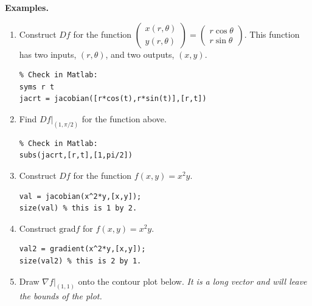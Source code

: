 \documentclass[12pt,letterpaper,noanswers]{exam}
\begin{document}
\noindent\textbf{Examples.}

\begin{enumerate}
\item Construct $Df$ for the function $\left(\begin{array}{c} x(r,\theta) \\ y(r,\theta) \end{array}\right) = \left(\begin{array}{c} r\cos\theta \\ r\sin\theta \end{array}\right)$.  This function has two inputs, $(r,\theta)$, and two outputs, $(x,y)$.
\vspace{0.7in}



\begin{lstlisting}
% Check in Matlab:
syms r t
jacrt = jacobian([r*cos(t),r*sin(t)],[r,t])
\end{lstlisting}

\item Find $\left.Df\right\vert_{(1,\pi/2)}$ for the function above.
\vspace{0.5in}


\begin{lstlisting}
% Check in Matlab:
subs(jacrt,[r,t],[1,pi/2])
\end{lstlisting}

\item Construct $Df$ for the function $f(x,y) = x^2y$.
\vspace{0.3in}

\begin{lstlisting}
val = jacobian(x^2*y,[x,y]);
size(val) % this is 1 by 2.
\end{lstlisting}

\item Construct $\text{grad} f$ for $f(x,y) = x^2y$.

\begin{lstlisting}
val2 = gradient(x^2*y,[x,y]);
size(val2) % this is 2 by 1.
\end{lstlisting}
\item Draw $\left.\nabla f\right\vert_{(1,1)}$ onto the contour plot below.  \emph{It is a long vector and will leave the bounds of the plot.}


\end{enumerate}
\end{document}
